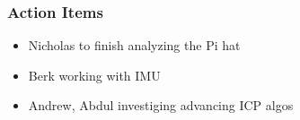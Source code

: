 		\subsubsection*{Action Items}
			\begin{itemize}
				\item Nicholas to finish analyzing the Pi hat
				\item Berk working with IMU
				\item Andrew, Abdul investiging advancing ICP algos
			\end{itemize}


